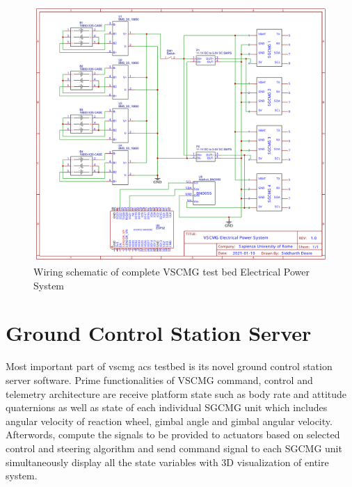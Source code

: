 \begin{figure}[ht]
    \centering
    \includegraphics[width=\textwidth]{figures/Assembly/EPS.pdf}
    \caption{Wiring schematic of complete VSCMG test bed Electrical Power System}
    \label{fig:sch_EPS}
\end{figure}
\section{Ground Control Station Server}
Most important part of \acrshort{vscmg} \acrshort{acs} testbed is its novel ground control station server software. Prime functionalities of VSCMG command, control and telemetry architecture are receive platform state such as body rate and attitude quaternions as well as state of each individual SGCMG unit which includes angular velocity of reaction wheel, gimbal angle and gimbal angular velocity. Afterwords, compute the signals to be provided to actuators based on selected  control and steering algorithm and send command signal to each SGCMG unit simultaneously display all the state variables with 3D visualization of entire system. 
